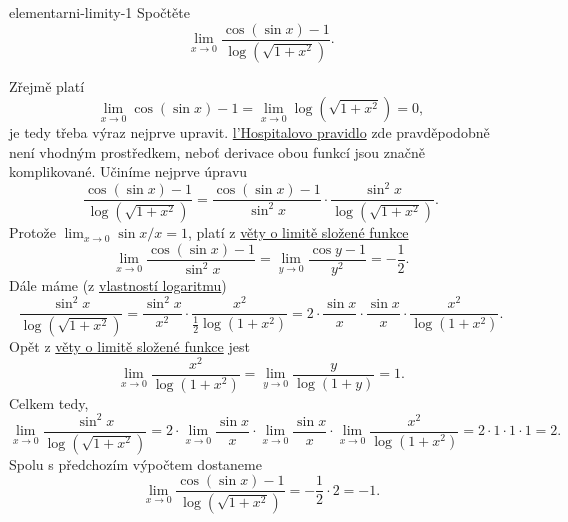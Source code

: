 \begin{problem}{}{elementarni-limity-1}
 Spočtěte
 \[
  \lim_{x \to 0} \frac{\cos(\sin x) - 1}{\log(\sqrt{1 + x^2})}.
 \]
\end{problem}
\begin{probsol}
 Zřejmě platí
 \[
  \lim_{x \to 0} \cos(\sin x) - 1 = \lim_{x \to 0} \log(\sqrt{1 + x^2}) = 0,
 \]
 je tedy třeba výraz nejprve upravit.
 \hyperref[thm:lhospitalovo-pravidlo]{l'Hospitalovo pravidlo} zde pravděpodobně
 není vhodným prostředkem, neboť derivace obou funkcí jsou značně komplikované.
 Učiníme nejprve úpravu
 \[
  \frac{\cos(\sin x) - 1}{\log(\sqrt{1 + x^2})} = \frac{\cos(\sin x) -
  1}{\sin^2 x} \cdot \frac{\sin^2 x}{\log(\sqrt{1 + x^2})}.
 \]
 Protože $\lim_{x \to 0} \sin x / x = 1$, platí z
 \hyperref[thm:limita-slozene-funkce]{věty o limitě složené funkce}
 \[
  \lim_{x \to 0} \frac{\cos(\sin x) - 1}{\sin^2 x} = \lim_{y \to 0} \frac{\cos y
  - 1}{y^2} = -\frac{1}{2}.
 \]
 Dále máme (z \hyperref[prop:vlastnosti-logaritmu]{vlastností logaritmu})
 \[
  \frac{\sin^2 x}{\log(\sqrt{1 + x^2})} = \frac{\sin^2 x}{x^2} \cdot
  \frac{x^2}{\frac{1}{2}\log(1 + x^2)} = 2 \cdot \frac{\sin x}{x} \cdot
  \frac{\sin x}{x} \cdot \frac{x^2}{\log(1 + x^2)}.
 \]
 Opět z \hyperref[thm:limita-slozene-funkce]{věty o limitě složené funkce} jest
 \[
  \lim_{x \to 0} \frac{x^2}{\log(1 + x^2)} = \lim_{y \to 0} \frac{y}{\log(1 +
  y)} = 1.
 \]
 Celkem tedy,
 \[
  \lim_{x \to 0} \frac{\sin^2 x}{\log(\sqrt{1 + x^2})} = 2 \cdot \lim_{x \to 0}
  \frac{\sin x}{x} \cdot \lim_{x \to 0} \frac{\sin x}{x} \cdot \lim_{x \to 0}
  \frac{x^2}{\log(1 + x^2)} = 2 \cdot 1 \cdot 1 \cdot 1 = 2.
 \]
 Spolu s předchozím výpočtem dostaneme
 \[
  \lim_{x \to 0} \frac{\cos(\sin x) - 1}{\log(\sqrt{1 + x^2})} = -\frac{1}{2}
  \cdot 2 = -1.
 \]
\end{probsol}


